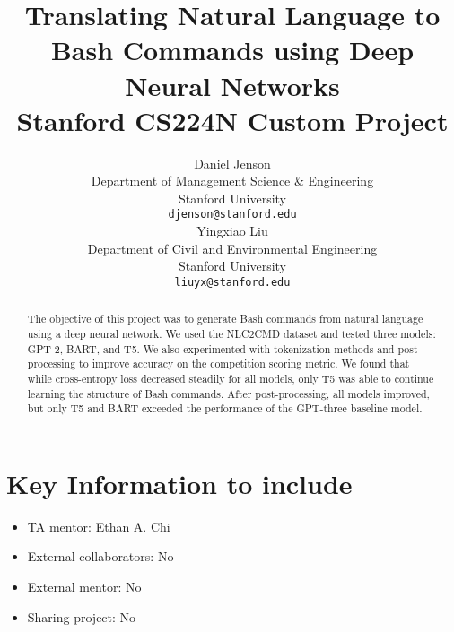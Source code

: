 \documentclass{article}
\title{
  Translating Natural Language to Bash Commands using Deep Neural Networks \\
  \vspace{1em}
  \small{\normalfont Stanford CS224N Custom Project}
}
\author{
 Daniel Jenson \\
  Department of Management Science \& Engineering \\
  Stanford University \\
  \texttt{djenson@stanford.edu} \\
  \And
  Yingxiao Liu \\
  Department of Civil and Environmental Engineering \\
  Stanford University \\
  \texttt{liuyx@stanford.edu} \\
}
\begin{document}
\maketitle

\begin{abstract}
  The objective of this project was to generate Bash commands from natural
  language using a deep neural network. We used the NLC2CMD dataset and tested
  three models: GPT-2, BART, and T5. We also experimented with tokenization methods
  and post-processing to improve accuracy on the competition scoring metric. We
  found that while cross-entropy loss decreased steadily for all models,
  only T5 was able to continue learning the structure of Bash commands. After
  post-processing, all models improved, but only T5 and BART exceeded
  the performance of the GPT-three baseline model.
\end{abstract}


\section{Key Information to include}
\begin{itemize}
	\item TA mentor: Ethan A. Chi
	\item External collaborators: No
	\item External mentor: No
	\item Sharing project: No
\end{itemize}



\end{document}
